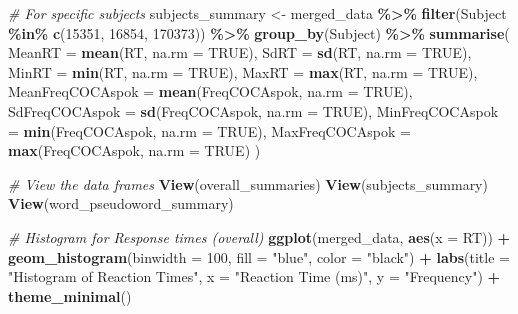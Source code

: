 \documentclass[
]{article}
\newenvironment{Shaded}{\begin{snugshade}}{\end{snugshade}}
\newcommand{\AttributeTok}[1]{\textcolor[rgb]{0.13,0.29,0.53}{#1}}
\newcommand{\CommentTok}[1]{\textcolor[rgb]{0.56,0.35,0.01}{\textit{#1}}}
\newcommand{\ConstantTok}[1]{\textcolor[rgb]{0.56,0.35,0.01}{#1}}
\newcommand{\DecValTok}[1]{\textcolor[rgb]{0.00,0.00,0.81}{#1}}
\newcommand{\FunctionTok}[1]{\textcolor[rgb]{0.13,0.29,0.53}{\textbf{#1}}}
\newcommand{\NormalTok}[1]{#1}
\newcommand{\OtherTok}[1]{\textcolor[rgb]{0.56,0.35,0.01}{#1}}
\newcommand{\SpecialCharTok}[1]{\textcolor[rgb]{0.81,0.36,0.00}{\textbf{#1}}}
\newcommand{\StringTok}[1]{\textcolor[rgb]{0.31,0.60,0.02}{#1}}
\begin{document}
\begin{Shaded}
\begin{Highlighting}[]
\CommentTok{\# For specific subjects}
\NormalTok{subjects\_summary }\OtherTok{\textless{}{-}}\NormalTok{ merged\_data }\SpecialCharTok{\%\textgreater{}\%}
  \FunctionTok{filter}\NormalTok{(Subject }\SpecialCharTok{\%in\%} \FunctionTok{c}\NormalTok{(}\DecValTok{15351}\NormalTok{, }\DecValTok{16854}\NormalTok{, }\DecValTok{170373}\NormalTok{)) }\SpecialCharTok{\%\textgreater{}\%}
  \FunctionTok{group\_by}\NormalTok{(Subject) }\SpecialCharTok{\%\textgreater{}\%}
  \FunctionTok{summarise}\NormalTok{(}
    \AttributeTok{MeanRT =} \FunctionTok{mean}\NormalTok{(RT, }\AttributeTok{na.rm =} \ConstantTok{TRUE}\NormalTok{),}
    \AttributeTok{SdRT =} \FunctionTok{sd}\NormalTok{(RT, }\AttributeTok{na.rm =} \ConstantTok{TRUE}\NormalTok{),}
    \AttributeTok{MinRT =} \FunctionTok{min}\NormalTok{(RT, }\AttributeTok{na.rm =} \ConstantTok{TRUE}\NormalTok{),}
    \AttributeTok{MaxRT =} \FunctionTok{max}\NormalTok{(RT, }\AttributeTok{na.rm =} \ConstantTok{TRUE}\NormalTok{),}
    \AttributeTok{MeanFreqCOCAspok =} \FunctionTok{mean}\NormalTok{(FreqCOCAspok, }\AttributeTok{na.rm =} \ConstantTok{TRUE}\NormalTok{),}
    \AttributeTok{SdFreqCOCAspok =} \FunctionTok{sd}\NormalTok{(FreqCOCAspok, }\AttributeTok{na.rm =} \ConstantTok{TRUE}\NormalTok{),}
    \AttributeTok{MinFreqCOCAspok =} \FunctionTok{min}\NormalTok{(FreqCOCAspok, }\AttributeTok{na.rm =} \ConstantTok{TRUE}\NormalTok{),}
    \AttributeTok{MaxFreqCOCAspok =} \FunctionTok{max}\NormalTok{(FreqCOCAspok, }\AttributeTok{na.rm =} \ConstantTok{TRUE}\NormalTok{)}
\NormalTok{  )}

\CommentTok{\# View the data frames}
\FunctionTok{View}\NormalTok{(overall\_summaries)}
\FunctionTok{View}\NormalTok{(subjects\_summary)}
\FunctionTok{View}\NormalTok{(word\_pseudoword\_summary)}

\CommentTok{\# Histogram for Response times (overall)}
\FunctionTok{ggplot}\NormalTok{(merged\_data, }\FunctionTok{aes}\NormalTok{(}\AttributeTok{x =}\NormalTok{ RT)) }\SpecialCharTok{+}
  \FunctionTok{geom\_histogram}\NormalTok{(}\AttributeTok{binwidth =} \DecValTok{100}\NormalTok{, }\AttributeTok{fill =} \StringTok{"blue"}\NormalTok{, }\AttributeTok{color =} \StringTok{"black"}\NormalTok{) }\SpecialCharTok{+}
  \FunctionTok{labs}\NormalTok{(}\AttributeTok{title =} \StringTok{"Histogram of Reaction Times"}\NormalTok{, }\AttributeTok{x =} \StringTok{"Reaction Time (ms)"}\NormalTok{, }\AttributeTok{y =} \StringTok{"Frequency"}\NormalTok{) }\SpecialCharTok{+}
  \FunctionTok{theme\_minimal}\NormalTok{()}
\end{Highlighting}
\end{Shaded}
\end{document}
